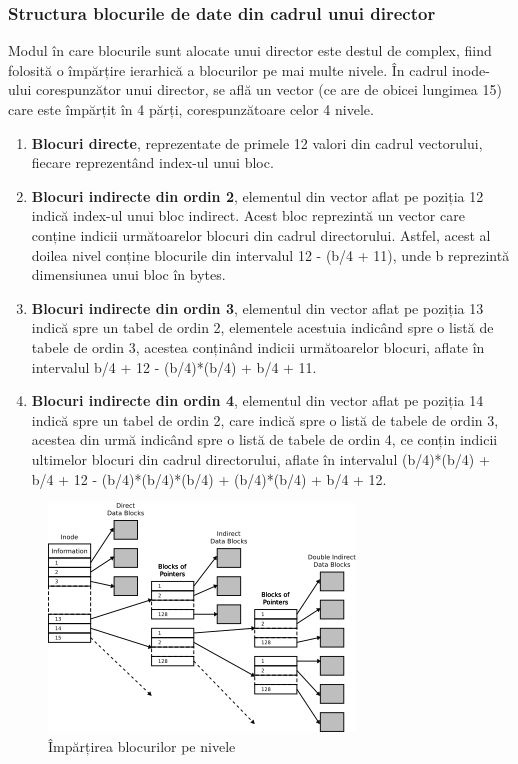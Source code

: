\subsubsection{Structura blocurile de date din cadrul unui director}

Modul în care blocurile sunt alocate unui director este destul de complex, fiind folosită o împărțire ierarhică a blocurilor pe mai multe nivele. În cadrul inode-ului corespunzător unui director, se află un vector (ce are de obicei lungimea 15) care este împărțit în 4 părți, corespunzătoare celor 4 nivele.

\begin{enumerate}
  \item \textbf{Blocuri directe}, reprezentate de primele 12 valori din cadrul vectorului, fiecare reprezentând index-ul unui bloc.

  \item \textbf{Blocuri indirecte din ordin 2}, elementul din vector aflat pe poziția 12 indică index-ul unui bloc indirect. Acest bloc reprezintă un vector care conține indicii următoarelor blocuri din cadrul directorului. Astfel, acest al doilea nivel conține blocurile din intervalul 12 - (b/4 + 11), unde b reprezintă dimensiunea unui bloc în bytes.

  \item \textbf{Blocuri indirecte din ordin 3}, elementul din vector aflat pe poziția 13 indică spre un tabel de ordin 2, elementele acestuia indicând spre o listă de tabele de ordin 3, acestea conținând indicii următoarelor blocuri, aflate în intervalul b/4 + 12 -  (b/4)*(b/4) + b/4 + 11.

  \item \textbf{Blocuri indirecte din ordin 4}, elementul din vector aflat pe poziția 14 indică spre un tabel de ordin 2, care indică spre o listă de tabele de ordin 3, acestea din urmă indicând spre o listă de tabele de ordin 4, ce conțin indicii ultimelor blocuri din cadrul directorului, aflate în intervalul (b/4)*(b/4) + b/4 + 12 - (b/4)*(b/4)*(b/4) + (b/4)*(b/4) + b/4 + 12.

\end{enumerate}

\begin{figure}[h!]
    \centering
    \includegraphics[width=0.9\linewidth]{images/2.7.png}
    \caption{Împărțirea blocurilor pe nivele}
    \label{fig:enter-label}
\end{figure}

